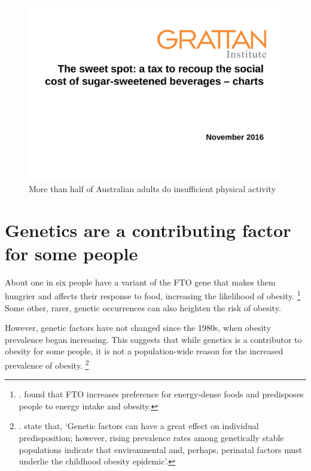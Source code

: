 \documentclass[embargoed]{grattan}
\begin{document}
\begin{figure}
\caption{More than half of Australian adults do insufficient physical activity}\label{fig:More-than-half-Aust-adults-insufficient-physical-activity}

\includegraphics[page=5]{atlas/ObesityCharts}


\end{figure}

\section{Genetics are a contributing factor for some people}\label{genetics-are-a-contributing-factor-for-some-people}

About one in six people have a variant of the FTO gene that makes them hungrier and affects their response to food, increasing the likelihood of obesity.%
\footnote{\textcite{Frayling2007commonvariantFTO}. \textcite{Karra2013linkFTOghrelin} found that FTO increases preference for energy-dense foods and predisposes people to energy intake and obesity.} Some other, rarer, genetic occurrences can also heighten the risk of obesity.

However, genetic factors have not changed since the 1980s, when obesity prevalence began increasing.
This suggests that while genetics is a contributor to obesity for some people, it is not a population-wide reason for the increased prevalence of obesity.%
\footnote{\textcite{Karra2013linkFTOghrelin}. \textcite{Ebbeling2002Childhoodobesitypublic} state that, `Genetic factors can have a great effect on individual predisposition; however, rising prevalence rates among genetically stable populations indicate that environmental and, perhaps, perinatal factors must underlie the childhood obesity epidemic'.}
\end{document}
